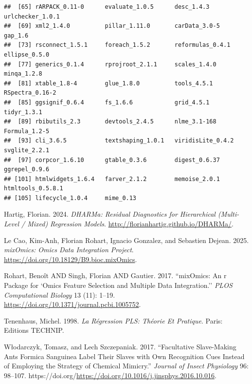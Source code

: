 \documentclass[
]{article}
\newlength{\cslhangindent}
\newenvironment{CSLReferences}[2] %
 {\begin{list}{}{%
  \setlength{\itemindent}{0pt}
  \setlength{\leftmargin}{0pt}
  \setlength{\parsep}{0pt}
  \ifodd #1
   \setlength{\leftmargin}{\cslhangindent}
   \setlength{\itemindent}{-1\cslhangindent}
  \fi
  \setlength{\itemsep}{#2\baselineskip}}}
 {\end{list}}
\begin{document}
\begin{verbatim}
##  [65] rARPACK_0.11-0      evaluate_1.0.5      desc_1.4.3          urlchecker_1.0.1   
##  [69] xml2_1.4.0          pillar_1.11.0       carData_3.0-5       gap_1.6            
##  [73] rsconnect_1.5.1     foreach_1.5.2       reformulas_0.4.1    ellipse_0.5.0      
##  [77] generics_0.1.4      rprojroot_2.1.1     scales_1.4.0        minqa_1.2.8        
##  [81] xtable_1.8-4        glue_1.8.0          tools_4.5.1         RSpectra_0.16-2    
##  [85] ggsignif_0.6.4      fs_1.6.6            grid_4.5.1          tidyr_1.3.1        
##  [89] rbibutils_2.3       devtools_2.4.5      nlme_3.1-168        Formula_1.2-5      
##  [93] cli_3.6.5           textshaping_1.0.1   viridisLite_0.4.2   svglite_2.2.1      
##  [97] corpcor_1.6.10      gtable_0.3.6        digest_0.6.37       ggrepel_0.9.6      
## [101] htmlwidgets_1.6.4   farver_2.1.2        memoise_2.0.1       htmltools_0.5.8.1  
## [105] lifecycle_1.0.4     mime_0.13
\end{verbatim}

\label{refs}
\begin{CSLReferences}{1}{0}
Hartig, Florian. 2024. \emph{DHARMa: Residual Diagnostics for Hierarchical (Multi-Level / Mixed) Regression Models}. \url{http://florianhartig.github.io/DHARMa/}.

Le Cao, Kim-Anh, Florian Rohart, Ignacio Gonzalez, and Sebastien Dejean. 2025. \emph{mixOmics: Omics Data Integration Project}. \url{https://doi.org/10.18129/B9.bioc.mixOmics}.

Rohart, Benoît AND Singh, Florian AND Gautier. 2017. {``mixOmics: An r Package for `Omics Feature Selection and Multiple Data Integration.''} \emph{PLOS Computational Biology} 13 (11): 1--19. \url{https://doi.org/10.1371/journal.pcbi.1005752}.

Tenenhaus, Michel. 1998. \emph{La Régression PLS: Théorie Et Pratique}. Paris: Editions TECHNIP.

Włodarczyk, Tomasz, and Lech Szczepaniak. 2017. {``Facultative Slave-Making Ants Formica Sanguinea Label Their Slaves with Own Recognition Cues Instead of Employing the Strategy of Chemical Mimicry.''} \emph{Journal of Insect Physiology} 96: 98--107. https://doi.org/\url{https://doi.org/10.1016/j.jinsphys.2016.10.016}.

\end{CSLReferences}
\end{document}
